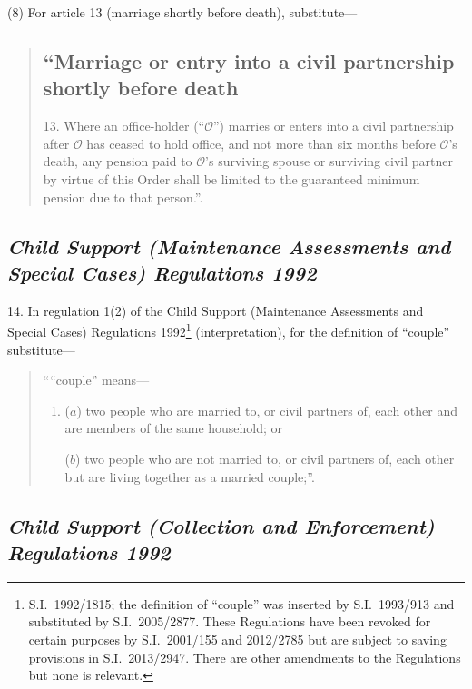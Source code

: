 \documentclass[12pt,a4paper]{article}
\begin{document}
(8) For article 13 (marriage shortly before death), substitute—
\begin{quotation}
\subsection*{\sloppy “Marriage or entry into a civil partnership shortly before death}

13.  Where an office-holder (“$\mathcal{O}$”) marries or enters into a civil partnership after $\mathcal{O}$ has ceased to hold office, and not more than six months before $\mathcal{O}$’s death, any pension paid to $\mathcal{O}$’s surviving spouse or surviving civil partner by virtue of this Order shall be limited to the guaranteed minimum pension due to that person.”.
\end{quotation}

\subsection*{\itshape Child Support (Maintenance Assessments and Special Cases) Regulations 1992}

14.  In regulation 1(2) of the Child Support (Maintenance Assessments and Special Cases) Regulations 1992\footnote{S.I.~1992/1815; the definition of “couple” was inserted by S.I.~1993/913 and substituted by S.I.~2005/2877. These Regulations have been revoked for certain purposes by S.I.~2001/155 and 2012/2785 but are subject to saving provisions in S.I.~2013/2947. There are other amendments to the Regulations but none is relevant.} (interpretation), for the definition of “couple” substitute—
\begin{quotation}
““couple” means—
\begin{enumerate}\item[]
($a$) 
two people who are married to, or civil partners of, each other and are members of the same household; or

($b$) 
two people who are not married to, or civil partners of, each other but are living together as a married couple;”.
\end{enumerate}
\end{quotation}

\subsection*{\itshape Child Support (Collection and Enforcement) Regulations 1992}
\end{document}
